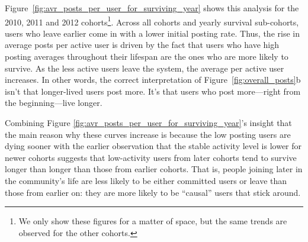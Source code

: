 Figure~\ref{fig:avr_posts_per_user_for_surviving_year} shows this analysis for the 2010, 2011 and 2012 cohorts\footnote{We only show these figures for a matter of space, but the same trends are observed for the other cohorts.}.  Across all cohorts and yearly survival sub-cohorts, users who leave earlier come in with a lower initial posting rate.  Thus, the rise in average posts per active user is driven by the fact that users who have high posting averages throughout their lifespan are the ones who are more likely to survive.  As the less active users leave the system, the average per active user increases.  In other words, the correct interpretation of Figure~\ref{fig:overall_posts}b isn't that longer-lived users post more.  It's that users who post more---right from the beginning---live longer. 

\begin{figure*}[!tb]
\centering
{}
\caption{Each Figure corresponds to one cohort, from 2010 to 2012, left to right. The users for each cohort are further divided in groups based on how long they survived: users that survived up to 1 year are labeled 0, from 1 to 2 years are labeled 1, and so on.  For all cohorts, longer-tenured users started at higher activity levels than shorter-tenured ones.}
\label{fig:avr_posts_per_user_for_surviving_year}
\end{figure*}


Combining Figure \ref{fig:avr_posts_per_user_for_surviving_year}'s insight that the main reason why these curves increase is because the low posting users are dying sooner with the earlier observation that the stable activity level is lower for newer cohorts suggests that low-activity users from later cohorts tend to survive longer than longer than those from earlier cohorts.  That is, people joining later in the community's life are less likely to be either committed users or leave than those from earlier on: they are more likely to be ``causal'' users that stick around.


